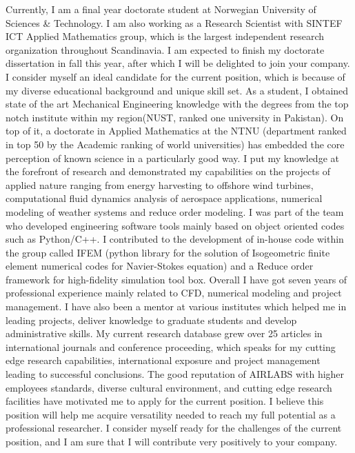 \documentclass[11pt, a4paper]{awesome-cv}
\begin{document}
\begin{cvletter}
		Currently, I am a final year doctorate student at Norwegian University of Sciences \& Technology. I am also working as a Research Scientist with SINTEF ICT Applied Mathematics group, which is the largest independent research organization throughout Scandinavia.  I am expected to finish my doctorate dissertation in fall this year, after which I will be delighted to join your company.
		I consider myself an ideal candidate for the current position, which is because of my diverse educational background and unique skill set. As a student, I obtained state of the art Mechanical Engineering knowledge with the degrees from the top notch institute within my region(NUST, ranked one university in Pakistan). On top of it, a doctorate in Applied Mathematics at the NTNU (department ranked in top 50 by the Academic ranking of world universities) has embedded the core perception of known science in a particularly good way. I put my knowledge at the forefront of research and demonstrated my capabilities on the projects of applied nature ranging from energy harvesting to offshore wind turbines, computational fluid dynamics analysis of aerospace applications, numerical modeling of weather systems and reduce order modeling. I was part of the team who developed engineering software tools mainly based on object oriented codes such as Python/C++.  I contributed to the development of in-house code within the group called IFEM (python library for the solution of Isogeometric finite element numerical codes for Navier-Stokes equation) and a Reduce order framework for high-fidelity simulation tool box.
		Overall I have got seven years of professional experience mainly related to CFD, numerical modeling and project management. I have also been a mentor at various institutes which helped me in leading projects, deliver knowledge to graduate students and develop administrative skills. My current research database grew over 25  articles in international journals and conference proceeding, which speaks for my cutting edge research capabilities, international exposure and project management leading to successful conclusions.
		The good reputation of AIRLABS with higher employees standards, diverse cultural environment, and cutting edge research facilities have motivated me to apply for the current position. I believe this position will help me acquire versatility needed to reach my full potential as a professional researcher. I consider myself ready for the challenges of the current position, and I am sure that I will contribute very positively to your company.
	\end{cvletter}
	
	
	\makeletterclosing
	
\end{document}
